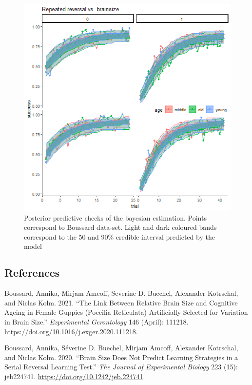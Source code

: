 \documentclass[
]{article}
\newlength{\cslhangindent}
\newlength{\cslentryspacingunit} %
\newenvironment{CSLReferences}[2] %
 {%
  \setlength{\parindent}{0pt}
  \ifodd #1
  \let\oldpar\par
  \def\par{\hangindent=\cslhangindent\oldpar}
  \fi
  \setlength{\parskip}{#2\cslentryspacingunit}
 }%
 {}
\begin{document}
\begin{figure}

\includegraphics[width=6.67in,]{images/boussard2_ppchecks} \hfill{}

\caption{Posterior predictive checks of the bayesian estimation. Points correspond to Boussard data-set. Light and dark coloured bands correspond to the 50 and 90\% credible interval predicted by the model}\label{fig:unnamed-chunk-9}
\end{figure}

\hypertarget{references}{%
\subsection*{References}\label{references}}

\hypertarget{refs}{}
\begin{CSLReferences}{1}{0}
\leavevmode{}%
Boussard, Annika, Mirjam Amcoff, Severine D. Buechel, Alexander
Kotrschal, and Niclas Kolm. 2021. {``The Link Between Relative Brain
Size and Cognitive Ageing in Female Guppies ({Poecilia} Reticulata)
Artificially Selected for Variation in Brain Size.''} \emph{Experimental
Gerontology} 146 (April): 111218.
\url{https://doi.org/10.1016/j.exger.2020.111218}.

\leavevmode{}%
Boussard, Annika, Séverine D. Buechel, Mirjam Amcoff, Alexander
Kotrschal, and Niclas Kolm. 2020. {``Brain Size Does Not Predict
Learning Strategies in a Serial Reversal Learning Test.''} \emph{The
Journal of Experimental Biology} 223 (15): jeb224741.
\url{https://doi.org/10.1242/jeb.224741}.

\end{CSLReferences}
\end{document}
